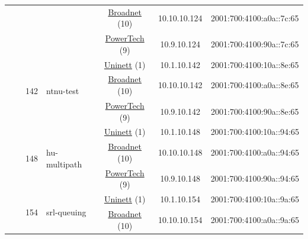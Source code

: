 \begin{small}
\begin{center}
\begin{longtable}{|c|c|c|c|c|c|c|c|}
  &  &  &  & \multicolumn{2}{|c|}{\tiny{\href{https://www.broadnet.no}{Broadnet} (10)}} & \tiny{10.10.10.124} & \tiny{2001:700:4100:a0a::7c:65} \\* \cline{5-5}\cline{6-6}\cline{7-7}\cline{8-8}
  &  &  &  & \multicolumn{2}{|c|}{\tiny{\href{http://www.powertech.no}{PowerTech} (9)}} & \tiny{10.9.10.124} & \tiny{2001:700:4100:90a::7c:65} \\* \cline{3-3}\cline{4-4}\cline{5-5}\cline{6-6}\cline{7-7}\cline{8-8}
  &  & \multirow{3}{*}{\tiny{142}} & \multicolumn{1}{|l|}{\multirow{3}{*}{\tiny{ntnu-test}}} & \multicolumn{2}{|c|}{\tiny{\href{https://www.uninett.no}{Uninett} (1)}} & \tiny{10.1.10.142} & \tiny{2001:700:4100:10a::8e:65} \\* \cline{5-5}\cline{6-6}\cline{7-7}\cline{8-8}
  &  &  &  & \multicolumn{2}{|c|}{\tiny{\href{https://www.broadnet.no}{Broadnet} (10)}} & \tiny{10.10.10.142} & \tiny{2001:700:4100:a0a::8e:65} \\* \cline{5-5}\cline{6-6}\cline{7-7}\cline{8-8}
  &  &  &  & \multicolumn{2}{|c|}{\tiny{\href{http://www.powertech.no}{PowerTech} (9)}} & \tiny{10.9.10.142} & \tiny{2001:700:4100:90a::8e:65} \\* \cline{3-3}\cline{4-4}\cline{5-5}\cline{6-6}\cline{7-7}\cline{8-8}
  &  & \multirow{3}{*}{\tiny{148}} & \multicolumn{1}{|l|}{\multirow{3}{*}{\tiny{hu-multipath}}} & \multicolumn{2}{|c|}{\tiny{\href{https://www.uninett.no}{Uninett} (1)}} & \tiny{10.1.10.148} & \tiny{2001:700:4100:10a::94:65} \\* \cline{5-5}\cline{6-6}\cline{7-7}\cline{8-8}
  &  &  &  & \multicolumn{2}{|c|}{\tiny{\href{https://www.broadnet.no}{Broadnet} (10)}} & \tiny{10.10.10.148} & \tiny{2001:700:4100:a0a::94:65} \\* \cline{5-5}\cline{6-6}\cline{7-7}\cline{8-8}
  &  &  &  & \multicolumn{2}{|c|}{\tiny{\href{http://www.powertech.no}{PowerTech} (9)}} & \tiny{10.9.10.148} & \tiny{2001:700:4100:90a::94:65} \\* \cline{3-3}\cline{4-4}\cline{5-5}\cline{6-6}\cline{7-7}\cline{8-8}
  &  & \multirow{3}{*}{\tiny{154}} & \multicolumn{1}{|l|}{\multirow{3}{*}{\tiny{srl-queuing}}} & \multicolumn{2}{|c|}{\tiny{\href{https://www.uninett.no}{Uninett} (1)}} & \tiny{10.1.10.154} & \tiny{2001:700:4100:10a::9a:65} \\* \cline{5-5}\cline{6-6}\cline{7-7}\cline{8-8}
  &  &  &  & \multicolumn{2}{|c|}{\tiny{\href{https://www.broadnet.no}{Broadnet} (10)}} & \tiny{10.10.10.154} & \tiny{2001:700:4100:a0a::9a:65} \\* \cline{5-5}\cline{6-6}\cline{7-7}\cline{8-8}

\end{longtable}
\end{center}
\end{small}
